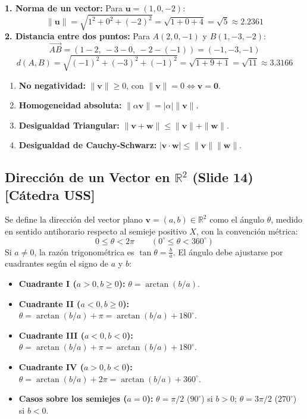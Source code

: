 \documentclass[10pt,letterpaper]{article}
\newcommand{\vu}{\mathbf{u}}
\newcommand{\vv}{\mathbf{v}}
\newcommand{\vw}{\mathbf{w}}
\begin{document}
\begin{cajaEjemplo}
\textbf{1. Norma de un vector:} Para $\vu = (1, 0, -2)$:
\[
\|\vu\| = \sqrt{1^2 + 0^2 + (-2)^2} = \sqrt{1 + 0 + 4} = \sqrt{5} \approx 2.2361
\]
\textbf{2. Distancia entre dos puntos:} Para $A(2, 0, -1)$ y $B(1, -3, -2)$:
\[
\overrightarrow{AB} = (1 - 2,\ -3 - 0,\ -2 - (-1)) = (-1, -3, -1)
\]
\[
d(A, B) = \sqrt{(-1)^2 + (-3)^2 + (-1)^2} = \sqrt{1 + 9 + 1} = \sqrt{11} \approx 3.3166
\]
\end{cajaEjemplo}

\begin{cajaTeorema}
\begin{enumerate}
    \item \textbf{No negatividad:} $\|\vv\| \ge 0$, con $\|\vv\| = 0 \iff \vv = \mathbf{0}$.
    \item \textbf{Homogeneidad absoluta:} $\|\alpha\vv\| = |\alpha| \|\vv\|$.
    \item \textbf{Desigualdad Triangular:} $\|\vv + \vw\| \le \|\vv\| + \|\vw\|$.
    \item \textbf{Desigualdad de Cauchy-Schwarz:} $|\vv \cdot \vw| \le \|\vv\| \|\vw\|$.
\end{enumerate}
\end{cajaTeorema}

\subsection{\texorpdfstring{Dirección de un Vector en $\mathbb{R}^2$ (Slide 14)}{Dirección de un Vector en R2 (Slide 14)} [Cátedra USS]}
Se define la dirección del vector plano $\vv = (a, b) \in \mathbb{R}^2$ como el ángulo $\theta$, medido en sentido antihorario respecto al semieje positivo $X$, con la convención métrica:
\[
0 \le \theta < 2\pi \qquad (0^\circ \le \theta < 360^\circ)
\]
Si $a \neq 0$, la razón trigonométrica es $\tan\theta = \frac{b}{a}$. El ángulo debe ajustarse por cuadrantes según el signo de $a$ y $b$:
\begin{itemize}
    \item \textbf{Cuadrante I ($a > 0, b \ge 0$):} $\theta = \arctan(b/a)$.
    \item \textbf{Cuadrante II ($a < 0, b \ge 0$):} $\theta = \arctan(b/a) + \pi = \arctan(b/a) + 180^\circ$.
    \item \textbf{Cuadrante III ($a < 0, b < 0$):} $\theta = \arctan(b/a) + \pi = \arctan(b/a) + 180^\circ$.
    \item \textbf{Cuadrante IV ($a > 0, b < 0$):} $\theta = \arctan(b/a) + 2\pi = \arctan(b/a) + 360^\circ$.
    \item \textbf{Casos sobre los semiejes ($a = 0$):} $\theta = \pi/2$ ($90^\circ$) si $b > 0$; $\theta = 3\pi/2$ ($270^\circ$) si $b < 0$.
\end{itemize}
\end{document}
